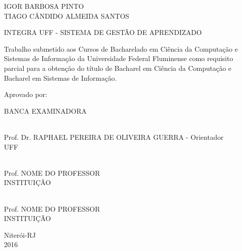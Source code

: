 
\begin{center}

IGOR BARBOSA PINTO
\\TIAGO CÂNDIDO ALMEIDA SANTOS

\vspace{1.0cm}

INTEGRA UFF - SISTEMA DE GESTÃO DE APRENDIZADO

\vspace{1.0cm}

\begin{flushright}
\begin{minipage}{0.45\textwidth}

Trabalho submetido aos Cursos de Bacharelado em Ciência da Computação e Sistemas de Informação da Universidade Federal Fluminense como requisito parcial para a obtenção do título de Bacharel em Ciência da Computação e Bacharel em Sistemas de Informação.

\end{minipage}
\end{flushright}

\vfill

\begin{flushleft}

Aprovado por:

\end{flushleft}

\vfill

BANCA EXAMINADORA

\vfill

\hrulefill \\Prof. Dr. RAPHAEL PEREIRA DE OLIVEIRA GUERRA - Orientador\\UFF\\

\vfill

\hrulefill \\Prof. NOME DO PROFESSOR\\INSTITUIÇÃO\\

\vfill

\hrulefill \\Prof. NOME DO PROFESSOR\\INSTITUIÇÃO\\

\vfill

Niterói-RJ\\2016

\end{center}

\newpage